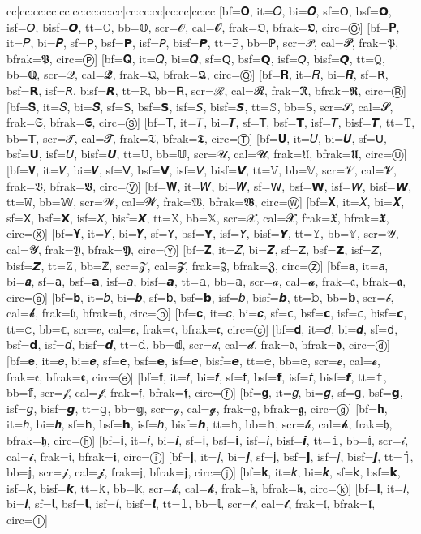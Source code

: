 \documentclass{unittest}
\begin{document}
\begin{tabular}{cc|cc:cc:cc:cc|cc:cc:cc:cc|cc:cc:cc|cc:cc|cc:cc}
[bf=𝐎, it=𝑂, bi=𝑶, sf=𝖮, bsf=𝗢, isf=𝘖, bisf=𝙊, tt=𝙾, bb=𝕆, scr=𝒪, cal=𝓞, frak=𝔒, bfrak=𝕺, circ=Ⓞ]
[bf=𝐏, it=𝑃, bi=𝑷, sf=𝖯, bsf=𝗣, isf=𝘗, bisf=𝙋, tt=𝙿, bb=ℙ, scr=𝒫, cal=𝓟, frak=𝔓, bfrak=𝕻, circ=Ⓟ]
[bf=𝐐, it=𝑄, bi=𝑸, sf=𝖰, bsf=𝗤, isf=𝘘, bisf=𝙌, tt=𝚀, bb=ℚ, scr=𝒬, cal=𝓠, frak=𝔔, bfrak=𝕼, circ=Ⓠ]
[bf=𝐑, it=𝑅, bi=𝑹, sf=𝖱, bsf=𝗥, isf=𝘙, bisf=𝙍, tt=𝚁, bb=ℝ, scr=ℛ, cal=𝓡, frak=ℜ, bfrak=𝕽, circ=Ⓡ]
[bf=𝐒, it=𝑆, bi=𝑺, sf=𝖲, bsf=𝗦, isf=𝘚, bisf=𝙎, tt=𝚂, bb=𝕊, scr=𝒮, cal=𝓢, frak=𝔖, bfrak=𝕾, circ=Ⓢ]
[bf=𝐓, it=𝑇, bi=𝑻, sf=𝖳, bsf=𝗧, isf=𝘛, bisf=𝙏, tt=𝚃, bb=𝕋, scr=𝒯, cal=𝓣, frak=𝔗, bfrak=𝕿, circ=Ⓣ]
[bf=𝐔, it=𝑈, bi=𝑼, sf=𝖴, bsf=𝗨, isf=𝘜, bisf=𝙐, tt=𝚄, bb=𝕌, scr=𝒰, cal=𝓤, frak=𝔘, bfrak=𝖀, circ=Ⓤ]
[bf=𝐕, it=𝑉, bi=𝑽, sf=𝖵, bsf=𝗩, isf=𝘝, bisf=𝙑, tt=𝚅, bb=𝕍, scr=𝒱, cal=𝓥, frak=𝔙, bfrak=𝖁, circ=Ⓥ]
[bf=𝐖, it=𝑊, bi=𝑾, sf=𝖶, bsf=𝗪, isf=𝘞, bisf=𝙒, tt=𝚆, bb=𝕎, scr=𝒲, cal=𝓦, frak=𝔚, bfrak=𝖂, circ=Ⓦ]
[bf=𝐗, it=𝑋, bi=𝑿, sf=𝖷, bsf=𝗫, isf=𝘟, bisf=𝙓, tt=𝚇, bb=𝕏, scr=𝒳, cal=𝓧, frak=𝔛, bfrak=𝖃, circ=Ⓧ]
[bf=𝐘, it=𝑌, bi=𝒀, sf=𝖸, bsf=𝗬, isf=𝘠, bisf=𝙔, tt=𝚈, bb=𝕐, scr=𝒴, cal=𝓨, frak=𝔜, bfrak=𝖄, circ=Ⓨ]
[bf=𝐙, it=𝑍, bi=𝒁, sf=𝖹, bsf=𝗭, isf=𝘡, bisf=𝙕, tt=𝚉, bb=ℤ, scr=𝒵, cal=𝓩, frak=ℨ, bfrak=𝖅, circ=Ⓩ]
\midrule%
[bf=𝐚, it=𝑎, bi=𝒂, sf=𝖺, bsf=𝗮, isf=𝘢, bisf=𝙖, tt=𝚊, bb=𝕒, scr=𝒶, cal=𝓪, frak=𝔞, bfrak=𝖆, circ=ⓐ]
[bf=𝐛, it=𝑏, bi=𝒃, sf=𝖻, bsf=𝗯, isf=𝘣, bisf=𝙗, tt=𝚋, bb=𝕓, scr=𝒷, cal=𝓫, frak=𝔟, bfrak=𝖇, circ=ⓑ]
[bf=𝐜, it=𝑐, bi=𝒄, sf=𝖼, bsf=𝗰, isf=𝘤, bisf=𝙘, tt=𝚌, bb=𝕔, scr=𝒸, cal=𝓬, frak=𝔠, bfrak=𝖈, circ=ⓒ]
[bf=𝐝, it=𝑑, bi=𝒅, sf=𝖽, bsf=𝗱, isf=𝘥, bisf=𝙙, tt=𝚍, bb=𝕕, scr=𝒹, cal=𝓭, frak=𝔡, bfrak=𝖉, circ=ⓓ]
[bf=𝐞, it=𝑒, bi=𝒆, sf=𝖾, bsf=𝗲, isf=𝘦, bisf=𝙚, tt=𝚎, bb=𝕖, scr=ℯ, cal=𝓮, frak=𝔢, bfrak=𝖊, circ=ⓔ]
[bf=𝐟, it=𝑓, bi=𝒇, sf=𝖿, bsf=𝗳, isf=𝘧, bisf=𝙛, tt=𝚏, bb=𝕗, scr=𝒻, cal=𝓯, frak=𝔣, bfrak=𝖋, circ=ⓕ]
[bf=𝐠, it=𝑔, bi=𝒈, sf=𝗀, bsf=𝗴, isf=𝘨, bisf=𝙜, tt=𝚐, bb=𝕘, scr=ℊ, cal=𝓰, frak=𝔤, bfrak=𝖌, circ=ⓖ]
[bf=𝐡, it=ℎ, bi=𝒉, sf=𝗁, bsf=𝗵, isf=𝘩, bisf=𝙝, tt=𝚑, bb=𝕙, scr=𝒽, cal=𝓱, frak=𝔥, bfrak=𝖍, circ=ⓗ]
[bf=𝐢, it=𝑖, bi=𝒊, sf=𝗂, bsf=𝗶, isf=𝘪, bisf=𝙞, tt=𝚒, bb=𝕚, scr=𝒾, cal=𝓲, frak=𝔦, bfrak=𝖎, circ=ⓘ]
[bf=𝐣, it=𝑗, bi=𝒋, sf=𝗃, bsf=𝗷, isf=𝘫, bisf=𝙟, tt=𝚓, bb=𝕛, scr=𝒿, cal=𝓳, frak=𝔧, bfrak=𝖏, circ=ⓙ]
[bf=𝐤, it=𝑘, bi=𝒌, sf=𝗄, bsf=𝗸, isf=𝘬, bisf=𝙠, tt=𝚔, bb=𝕜, scr=𝓀, cal=𝓴, frak=𝔨, bfrak=𝖐, circ=ⓚ]
[bf=𝐥, it=𝑙, bi=𝒍, sf=𝗅, bsf=𝗹, isf=𝘭, bisf=𝙡, tt=𝚕, bb=𝕝, scr=𝓁, cal=𝓵, frak=𝔩, bfrak=𝖑, circ=ⓛ]

\end{tabular}
\end{document}

